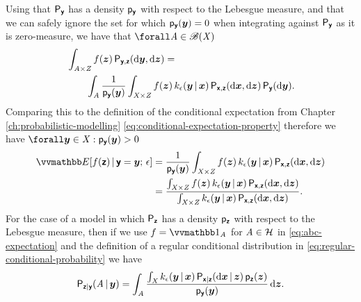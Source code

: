 Using that $\mathsf{P}_{\boldsymbol{\mathsf{y}}}$ has a density $\mathsf{p}_{\boldsymbol{\mathsf{y}}}$ with respect to the Lebesgue measure, and that we can safely ignore the set for which $\mathsf{p}_{\boldsymbol{\mathsf{y}}}(\boldsymbol{y}) = 0$ when integrating against $\mathsf{P}_{\boldsymbol{\mathsf{y}}}$ as it is zero-measure, we have that $\forall \set{A} \in \borel(\set{X})$
\begin{equation}\label{eq:abc-conditional-expectation-derivation-2}
\begin{split}
  &\int_{\mathit{A} \times \mathit{Z}} 
    f(\boldsymbol{z}) 
  \,\mathsf{P}_{\boldsymbol{\mathsf{y}},\boldsymbol{\mathsf{z}}}(\mathrm{d}\boldsymbol{y},\mathrm{d}\boldsymbol{z}) 
  =\,\\
  &\qquad
  \int_{\mathit{A}} \frac{1}{\mathsf{p}_{\boldsymbol{\mathsf{y}}}(\boldsymbol{y})}
  \int_{\mathit{X}\times\mathit{Z}}
    f(\boldsymbol{z})\,k_{\epsilon}(\boldsymbol{y}\operatorname{|}\boldsymbol{x})
  \,\mathsf{P}_{\boldsymbol{\mathsf{x}},\boldsymbol{\mathsf{z}}}(\mathrm{d}\boldsymbol{x},\mathrm{d}\boldsymbol{z})\,\mathsf{P}_{\boldsymbol{\mathsf{y}}}(\mathrm{d}\boldsymbol{y}).
\end{split}
\end{equation}
Comparing this to the definition of the conditional expectation from Chapter \ref{ch:probabilistic-modelling} \eqref{eq:conditional-expectation-property} therefore we have $\forall \vct{y} \in \set{X} : \pden{\rvct{y}}(\vct{y}) > 0$
\begin{equation}
  \label{eq:abc-expectation}
\begin{split}
  \expc{f(\rvct{z}) \gvn \rvct{y} = \vct{y};\,\epsilon} 
  &=
  \frac{1}{\pden{\rvct{y}}(\vct{y})}
  \int_{\set{X}\times\set{Z}}
    f(\vct{z})\,k_{\epsilon}(\vct{y}\gvn\vct{x})
  \,\prob{\rvct{x},\rvct{z}}(\dr\vct{x},\dr\vct{z})
  \\
  &=
  \frac{
  \int_{\set{X}\times\set{Z}}
    f(\vct{z})\,k_{\epsilon}(\vct{y}\gvn\vct{x})
  \,\prob{\rvct{x},\rvct{z}}(\dr\vct{x},\dr\vct{z})
  }
  {
  \int_{\set{X}\times\set{Z}}
    k_\epsilon(\vct{y}\gvn\vct{x})\,
  \prob{\rvct{x},\rvct{z}}(\dr\vct{x},\dr\vct{z})
  }.
\end{split}
\end{equation}
For the case of a model in which $\mathsf{P}_{\boldsymbol{\mathsf{z}}}$ has a density $\mathsf{p}_{\boldsymbol{\mathsf{z}}}$ with respect to the Lebesgue measure, then if we use $f = \ind{\set{A}}$ for $\mathit{A} \in \mathcal{H}$ in \eqref{eq:abc-expectation} and the definition of a regular conditional distribution in \eqref{eq:regular-conditional-probability} we have
\begin{equation}\label{eq:abc-posterior-derivation}
  \mathsf{P}_{\boldsymbol{\mathsf{z}}|\boldsymbol{\mathsf{y}}}(\mathit{A}\operatorname{|}\boldsymbol{y}) = 
  \int_{\mathit{A}} \frac{\int_{\mathit{X}} k_{\epsilon}(\boldsymbol{y}\operatorname{|}\boldsymbol{x}) \,\mathsf{P}_{\boldsymbol{\mathsf{x}}|\boldsymbol{\mathsf{z}}}(\mathrm{d}\boldsymbol{x}\operatorname{|}\boldsymbol{z}) \,\mathsf{p}_{\boldsymbol{\mathsf{z}}}(\boldsymbol{z})}{\mathsf{p}_{\boldsymbol{\mathsf{y}}}(\boldsymbol{y})}\,\mathrm{d}\boldsymbol{z}.
\end{equation}
